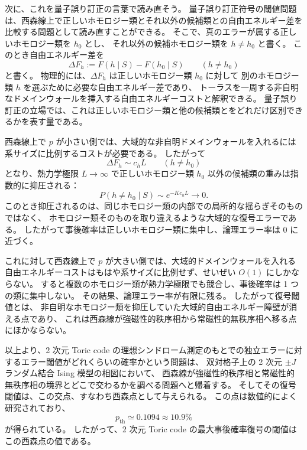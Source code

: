 \documentclass[../master.tex]{subfiles}
\begin{document}
次に、これを量子誤り訂正の言葉で読み直そう。
量子誤り訂正符号の閾値問題は、西森線上で正しいホモロジー類とそれ以外の候補類との自由エネルギー差を比較する問題として読み直すことができる。
そこで、真のエラーが属する正しいホモロジー類を \(h_0\) とし、
それ以外の候補ホモロジー類を \(h\neq h_0\) と書く。
このとき自由エネルギー差を
\begin{equation}
    \Delta F_h:=F(h\mid S)-F(h_0\mid S)
    \qquad (h\neq h_0)
\end{equation}
と書く。
物理的には、\(\Delta F_h\) は正しいホモロジー類 \(h_0\) に対して
別のホモロジー類 \(h\) を選ぶために必要な自由エネルギー差であり、
トーラスを一周する非自明なドメインウォールを挿入する自由エネルギーコストと解釈できる。
量子誤り訂正の立場では、これは正しいホモロジー類と他の候補類とをどれだけ区別できるかを表す量である。

西森線上で \(p\) が小さい側では、大域的な非自明ドメインウォールを入れるには系サイズに比例するコストが必要である。
したがって
\begin{equation}
    \Delta F_h\sim c_h L
    \qquad (h\neq h_0)
\end{equation}
となり、熱力学極限 \(L\to\infty\) で正しいホモロジー類 \(h_0\) 以外の候補類の重みは指数的に抑圧される：
\begin{equation}
    P(h\neq h_0\mid S)\sim e^{-K c_h L}\to 0.
\end{equation}
このとき抑圧されるのは、同じホモロジー類の内部での局所的な揺らぎそのものではなく、
ホモロジー類そのものを取り違えるような大域的な復号エラーである。
したがって事後確率は正しいホモロジー類に集中し、論理エラー率は 0 に近づく。

これに対して西森線上で \(p\) が大きい側では、大域的ドメインウォールを入れる自由エネルギーコストはもはや系サイズに比例せず、せいぜい \(O(1)\) にしかならない。
すると複数のホモロジー類が熱力学極限でも競合し、事後確率は 1 つの類に集中しない。
その結果、論理エラー率が有限に残る。
したがって復号閾値とは、
非自明なホモロジー類を抑圧していた大域的自由エネルギー障壁が消える点であり、
これは西森線が強磁性的秩序相から常磁性的無秩序相へ移る点にほかならない。

以上より、2 次元 Toric code の理想シンドローム測定のもとでの独立エラーに対するエラー閾値がどれくらいの確率かという問題は、
双対格子上の 2 次元 \(\pm J\) ランダム結合 Ising 模型の相図において、
西森線が強磁性的秩序相と常磁性的無秩序相の境界とどこで交わるかを調べる問題へと帰着する。
そしてその復号閾値は、この交点、すなわち西森点として与えられる。
この点は数値的によく研究されており、
\begin{equation}
    p_{\mathrm{th}}\simeq 0.1094 \approx 10.9\%
\end{equation}
が得られている。
したがって、2 次元 Toric code の最大事後確率復号の閾値はこの西森点の値である。
\end{document}
